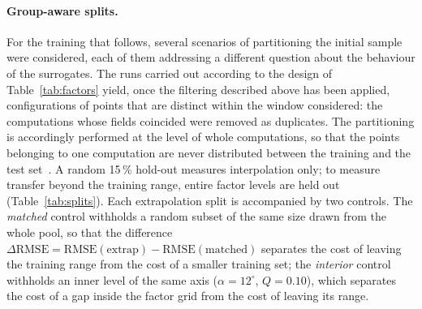 \paragraph{Group-aware splits.}
For the training that follows, several scenarios of partitioning the initial sample were considered, each of them addressing a different question about the behaviour of the surrogates.
The runs carried out according to the design of Table~\ref{tab:factors} yield, once the filtering described above has been applied, configurations of points that are distinct within the window considered: the computations whose fields coincided were removed as duplicates. The partitioning is accordingly performed at the level of whole computations, so that the points belonging to one computation are never distributed between the training and the test set~\cite{TODO-group-cv}. %
A random 15\,\% hold-out measures interpolation only; to measure transfer beyond the training range, entire factor levels are held out (Table~\ref{tab:splits}). %
Each extrapolation split is accompanied by two controls. The \emph{matched} control withholds a random subset of the same size drawn from the whole pool, so that the difference $\Delta\mathrm{RMSE} = \mathrm{RMSE}(\text{extrap}) - \mathrm{RMSE}(\text{matched})$ separates the cost of leaving the training range from the cost of a smaller training set; %
the \emph{interior} control withholds an inner level of the same axis ($\alpha = 12^\circ$, $Q = 0.10$), which separates the cost of a gap inside the factor grid from the cost of leaving its range. %
